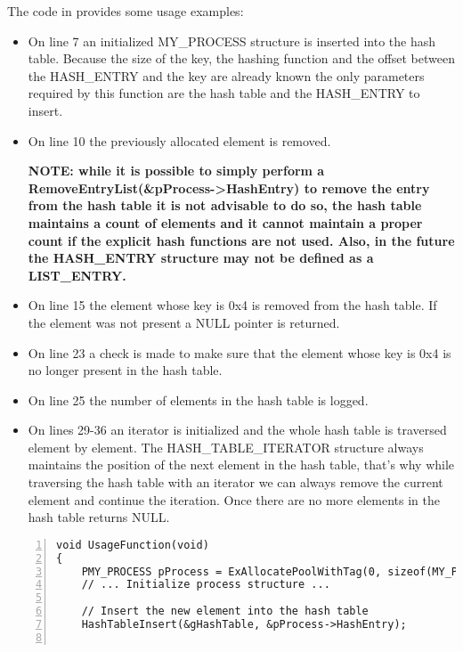 \begin{appendices}
The code in  provides some usage examples:
\begin{itemize}
	\item On line 7 an initialized MY\_PROCESS structure is inserted into the hash table. Because
	the size of the key, the hashing function and the offset between the HASH\_ENTRY and the key
	are already known the only parameters required by this function are the hash table and the
	HASH\_ENTRY to insert.
	
	\item On line 10 the previously allocated element is removed. 
	
	\textbf{NOTE: while it is possible
	to simply perform a RemoveEntryList(\&pProcess->HashEntry) to remove the entry from the hash table
	it is not advisable to do so, the hash table maintains a count of elements and it cannot maintain
	a proper count if the explicit hash functions are not used. Also, in the future the HASH\_ENTRY
	structure may not be defined as a LIST\_ENTRY.}
	
	\item On line 15 the element whose key is 0x4 is removed from the hash table. If the element
	was not present a NULL pointer is returned.
	
	\item On line 23 a check is made to make sure that the element whose key is 0x4 is no longer
	present in the hash table.
	
	\item On line 25 the number of elements in the hash table is logged.
	
	\item On lines 29-36 an iterator is initialized and the whole hash table is traversed element by
	element. The HASH\_TABLE\_ITERATOR structure always maintains the position of the next element
	in the hash table, that's why while traversing the hash table with an iterator we can always
	remove the current element and continue the iteration. Once there are no more elements in the
	hash table  returns NULL.
\end{itemize}

\begin{lstlisting}[caption={Hash Usage Example},label={lst:HashUsageEg},numbers=left]
void UsageFunction(void)
{
	PMY_PROCESS pProcess = ExAllocatePoolWithTag(0, sizeof(MY_PROCESS), HEAP_TEST_TAG, 0);
	// ... Initialize process structure ...

	// Insert the new element into the hash table
	HashTableInsert(&gHashTable, &pProcess->HashEntry);
	

\end{lstlisting}
\end{appendices}
